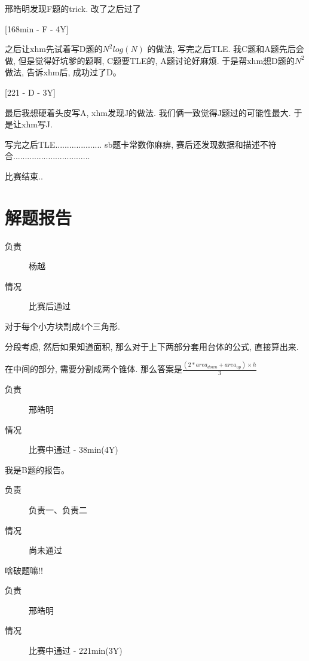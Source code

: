 邢皓明发现F题的trick. 改了之后过了

[168min - F - 4Y]

之后让xhm先试着写D题的$N^2log(N)$ 的做法, 写完之后TLE. 我C题和A题先后会做, 但是觉得好坑爹的题啊, C题要TLE的, A题讨论好麻烦. 于是帮xhm想D题的$N^2$做法, 告诉xhm后, 成功过了D。

[221 - D - 3Y]

最后我想硬着头皮写A, xhm发现J的做法. 我们俩一致觉得J题过的可能性最大. 于是让xhm写J.

写完之后TLE.................... sb题卡常数你麻痹, 赛后还发现数据和描述不符合.................................

比赛结束..

\section{解题报告}


\begin{description}
\item[负责] 杨越
\item[情况] 比赛后通过
\end{description}

对于每个小方块割成4个三角形.

分段考虑, 然后如果知道面积, 那么对于上下两部分套用台体的公式, 直接算出来.

在中间的部分, 需要分割成两个锥体. 那么答案是$\frac{(2*area_{down}+area_{up})\times h}{3}$


\begin{description}
\item[负责] 邢皓明
\item[情况] 比赛中通过 - 38min(4Y)
\end{description}

我是B题的报告。


\begin{description}
\item[负责] 负责一、负责二
\item[情况] 尚未通过
\end{description}

啥破题嘛!!


\begin{description}
\item[负责] 邢皓明
\item[情况] 比赛中通过 - 221min(3Y)
\end{description}

